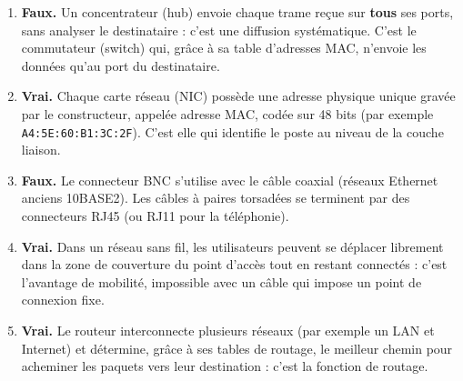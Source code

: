 \documentclass[11pt]{article}
\newcommand{\cle}[1]{{\popxbold\color{popdark}#1}}
\begin{document}
\begin{corrige}
\begin{enumerate}
  \item \textbf{Faux.} Un \cle{concentrateur} (hub) envoie chaque trame reçue sur \textbf{tous} ses ports, sans analyser le destinataire : c'est une \cle{diffusion} systématique. C'est le \cle{commutateur} (switch) qui, grâce à sa \cle{table d'adresses MAC}, n'envoie les données qu'au port du destinataire.
  \item \textbf{Vrai.} Chaque \cle{carte réseau} (NIC) possède une \cle{adresse physique} unique gravée par le constructeur, appelée \cle{adresse MAC}, codée sur 48 bits (par exemple \texttt{A4:5E:60:B1:3C:2F}). C'est elle qui identifie le poste au niveau de la \cle{couche liaison}.
  \item \textbf{Faux.} Le connecteur \cle{BNC} s'utilise avec le \cle{câble coaxial} (réseaux Ethernet anciens 10BASE2). Les câbles à \cle{paires torsadées} se terminent par des connecteurs \cle{RJ45} (ou \cle{RJ11} pour la téléphonie).
  \item \textbf{Vrai.} Dans un \cle{réseau sans fil}, les utilisateurs peuvent se déplacer librement dans la zone de couverture du \cle{point d'accès} tout en restant connectés : c'est l'avantage de \cle{mobilité}, impossible avec un câble qui impose un point de connexion fixe.
  \item \textbf{Vrai.} Le \cle{routeur} interconnecte plusieurs réseaux (par exemple un LAN et Internet) et détermine, grâce à ses \cle{tables de routage}, le meilleur chemin pour acheminer les paquets vers leur destination : c'est la fonction de \cle{routage}.
\end{enumerate}
\end{corrige}
\end{document}
